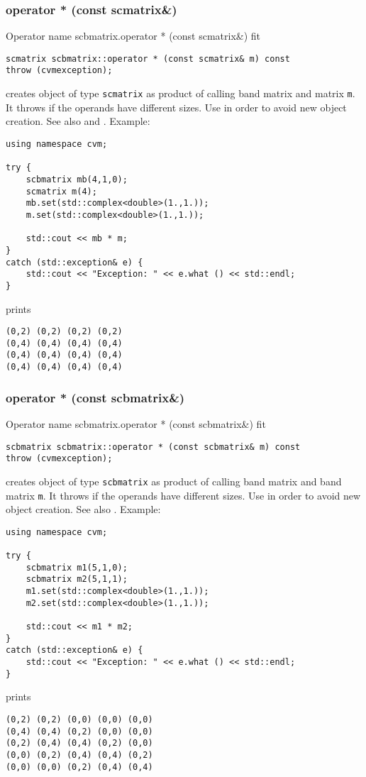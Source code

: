 \subsubsection{operator * (const scmatrix\&)}
Operator%
\pdfdest name {scbmatrix.operator * (const scmatrix&)} fit
\begin{verbatim}
scmatrix scbmatrix::operator * (const scmatrix& m) const
throw (cvmexception);
\end{verbatim}
creates  object of type \verb"scmatrix"
as  product of  calling band matrix and  matrix \verb"m".
It throws  
if the operands have different sizes.
Use  in order to avoid
 new object creation.
See also
 and .
Example:
\begin{Verbatim}
using namespace cvm;

try {
    scbmatrix mb(4,1,0);
    scmatrix m(4);
    mb.set(std::complex<double>(1.,1.));
    m.set(std::complex<double>(1.,1.));

    std::cout << mb * m;
}
catch (std::exception& e) {
    std::cout << "Exception: " << e.what () << std::endl;
}
\end{Verbatim}
prints
\begin{Verbatim}
(0,2) (0,2) (0,2) (0,2)
(0,4) (0,4) (0,4) (0,4)
(0,4) (0,4) (0,4) (0,4)
(0,4) (0,4) (0,4) (0,4)
\end{Verbatim}
\newpage



\subsubsection{operator * (const scbmatrix\&)}
Operator%
\pdfdest name {scbmatrix.operator * (const scbmatrix&)} fit
\begin{verbatim}
scbmatrix scbmatrix::operator * (const scbmatrix& m) const
throw (cvmexception);
\end{verbatim}
creates  object of type \verb"scbmatrix"
as  product of  calling band matrix and  band matrix \verb"m".
It throws  
if the operands have different sizes.
Use  in order to avoid
 new object creation.
See also
.
Example:
\begin{Verbatim}
using namespace cvm;

try {
    scbmatrix m1(5,1,0);
    scbmatrix m2(5,1,1);
    m1.set(std::complex<double>(1.,1.));
    m2.set(std::complex<double>(1.,1.));

    std::cout << m1 * m2;
}
catch (std::exception& e) {
    std::cout << "Exception: " << e.what () << std::endl;
}
\end{Verbatim}
prints
\begin{Verbatim}
(0,2) (0,2) (0,0) (0,0) (0,0)
(0,4) (0,4) (0,2) (0,0) (0,0)
(0,2) (0,4) (0,4) (0,2) (0,0)
(0,0) (0,2) (0,4) (0,4) (0,2)
(0,0) (0,0) (0,2) (0,4) (0,4)
\end{Verbatim}
\newpage


